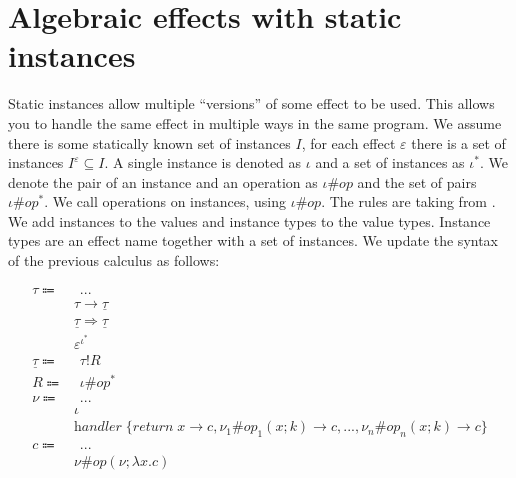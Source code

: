 \documentclass[12pt]{article}
\newcommand\eff[0]{\varepsilon}
\newcommand\eop[0]{\textit{op}}
\newcommand\allinsts[0]{I}
\newcommand\insts[1]{\allinsts^{#1}}
\newcommand\inst[0]{\iota}
\newcommand\instss[0]{\inst^*}
\newcommand\type[0]{\tau}
\newcommand\tarr[2]{#1 \rightarrow #2}
\newcommand\thandler[2]{#1 \Rightarrow #2}
\newcommand\tinst[2]{#1 ^{#2}}
\newcommand\ctype[0]{\underline{\type}}
\newcommand\cdirt[2]{#1 ! #2}
\newcommand\val[0]{\nu}
\newcommand\vhandler[1]{\textit{handler} \; \{#1\}}
\newcommand\vhandlerci[0]{\vhandler{
	\textit{return} \; x \rightarrow \comp,
	\val_1\#\eop_1(x ; k) \rightarrow \comp,
	...,
	\val_n\#\eop_n(x ; k) \rightarrow \comp
}}
\newcommand\comp[0]{c}
\newcommand\copi[5]{#1 \# #2(#3 ; \lambda #4 . #5)}
\begin{document}
\newpage
\section{Algebraic effects with static instances}

Static instances allow multiple ``versions'' of some effect to be used. This allows you to handle the same effect in multiple ways in the same program. We assume there is some statically known set of instances $\allinsts$, for each effect $\eff$ there is a set of instances $\insts{\eff} \subseteq \allinsts$. A single instance is denoted as $\inst$ and a set of instances as $\instss$. We denote the pair of an instance and an operation as $\inst\#\eop$ and the set of pairs $\inst\#\eop^*$. We call operations on instances, using $\inst\#\eop$. The rules are taking from \cite{effectsystem}.
We add instances to the values and instance types to the value types.
Instance types are an effect name together with a set of instances.
We update the syntax of the previous calculus as follows:

\begin{align*}
	\type \Coloneqq 	& \hspace{5pt}...							\tag{value types} \\
				& \tarr{\type}{\ctype}						\tag{type of functions}\\
				& \thandler{\ctype}{\ctype}					\tag{type of handlers} \\
				& \tinst{\eff}{\inst^*}						\tag{type of instances} \\
	\ctype \Coloneqq	& \hspace{5pt} \cdirt{\type}{R}					\tag{computation types} \\
	R \Coloneqq		& \hspace{5pt} \inst\#\eop^*					\tag{effect annotations} \\
	\val \Coloneqq	& \hspace{5pt}...							\tag{values} \\
				& \inst									\tag{instances} \\
				& \vhandlerci								\tag{handler} \\
	\comp \Coloneqq	& \hspace{5pt}...							\tag{computations} \\
				& \copi{\val}{\eop}{\val}{x}{\comp}				\tag{operation call} \\
\end{align*}
\end{document}
